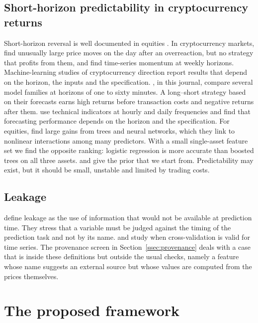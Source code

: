 \documentclass[preprint,12pt,authoryear,a4paper]{elsarticle}
\begin{document}
\subsection{Short-horizon predictability in cryptocurrency returns}

Short-horizon reversal is well documented in equities
\citep{jegadeesh1990evidence,lo1990contrarian}. In cryptocurrency markets,
\citet{caporale2019reverse} find unusually large price moves on the day after an
overreaction, but no strategy that profits from them, and \citet{liu2021risks} find
time-series momentum at weekly horizons. Machine-learning studies of cryptocurrency
direction report results that depend on the horizon, the inputs and the
specification. \citet{jaquart2021short}, in this journal, compare several model
families at horizons of one to sixty minutes. A long--short strategy based on their
forecasts earns high returns before transaction costs and negative returns after
them. \citet{gradojevic2023forecasting} use technical indicators at hourly and daily
frequencies and find that forecasting performance depends on the horizon and the
specification. For equities, \citet{gu2020empirical} find large gains from trees
and neural networks, which they link to nonlinear interactions among many
predictors. With a small single-asset feature set we find the opposite ranking:
logistic regression is more accurate than boosted trees on all three assets.
\citet{fama1970efficient} and \citet{timmermann2004efficient} give the prior that
we start from. Predictability may exist, but it should be small, unstable and
limited by trading costs.

\subsection{Leakage}

\citet{kaufman2012leakage} define leakage as the use of information that would not
be available at prediction time. They stress that a variable must be judged against
the timing of the prediction task and not by its name. \citet{bergmeir2012use} and
\citet{cerqueira2020evaluating} study when cross-validation is valid for time
series. The provenance screen in Section~\ref{ssec:provenance} deals with a case
that is inside these definitions but outside the usual checks, namely a feature
whose name suggests an external source but whose values are computed from the
prices themselves.

\section{The proposed framework}\label{sec:framework}
\end{document}
